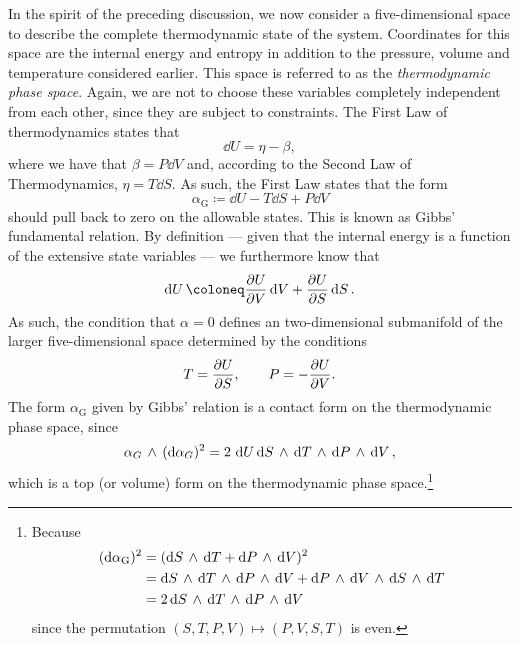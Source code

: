 In the spirit of the preceding discussion, we now consider a five-dimensional space to describe the complete thermodynamic state of the system. Coordinates for this space are the internal energy and entropy in addition to the pressure, volume and temperature considered earlier. This space is referred to as the \emph{thermodynamic phase space}. Again, we are not to choose these variables completely independent from each other, since they are subject to constraints. The First Law of thermodynamics states that
$$ \dd{U} = \eta - \beta, $$
where we have that $ \beta = P\dd{V} $ and, according to the Second Law of Thermodynamics, $\eta = T\dd{S}$. As such, the First Law states that the form
\begin{equation} 
    \alpha_\text{G} \coloneq \dd{U} - T\dd{S} + P\dd{V}
    \label{eq:gibbs_relation}
\end{equation}
should pull back to zero on the allowable states. This is known as Gibbs' fundamental relation. By definition --- given that the internal energy is a function of the extensive state variables ---  we furthermore know that
$$ \dd{U} \coloneq \pdv{U}{V}\dd{V} + \pdv{U}{S}\dd{S}.$$
As such, the condition that $\alpha = 0$ defines an two-dimensional submanifold of the larger five-dimensional space determined by the conditions
\begin{equation}
    T = \pdv{U}{S}, \qquad P = -\pdv{U}{V}. 
\end{equation}
The form $\alpha_\text{G}$ given by Gibbs' relation is a contact form on the thermodynamic phase space, since
$$  \alpha_G\,\wedge\,(\dd{\alpha_G})^2  = 2\,\dd{U}  \dd{S}\,\wedge\,\dd{T} \,\wedge\, \dd{P}\,\wedge\,\dd{V}  , $$
which is a top (or volume) form on the thermodynamic phase space.\footnote
{
    Because 
    \begin{equation*} 
        \begin{split}
            (\dd{\alpha_\text{G}})^2 &= ( \dd{S}\,\wedge\,\dd{T}  +  \dd{P}\,\wedge\,\dd{V} )^2 \\
                            &=   \dd{S}\,\wedge\,\dd{T} \,\wedge\, \dd{P}\,\wedge\,\dd{V}   +   \dd{P}\,\wedge\,\dd{V} \,\wedge\, \dd{S}\,\wedge\,\dd{T}   \\
                            &= 2  \dd{S}\,\wedge\,\dd{T} \,\wedge\, \dd{P}\,\wedge\,\dd{V}   \\
        \end{split}
    \end{equation*}
    since the permutation $ (S, T, P, V) \mapsto (P, V, S, T) $ is even.
}

